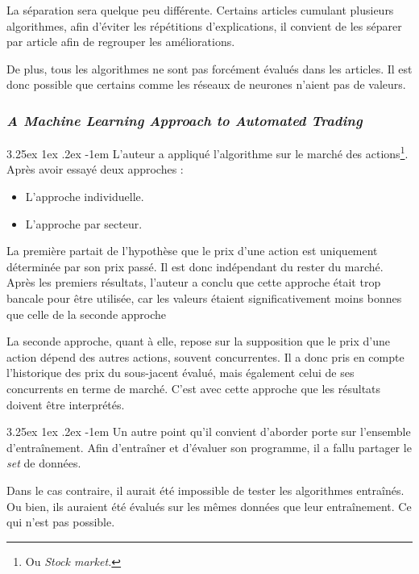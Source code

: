 \documentclass[a4paper, 11pt]{article}
\makeatletter
\newcounter{subsubsubsection}[subsubsection]
\renewcommand\paragraph{\@startsection{paragraph}{5}{\z@}%
  {3.25ex \@plus1ex \@minus.2ex}%
  {-1em}%
  {\normalfont\normalsize\bfseries}}
\makeatother
\begin{document}
La séparation sera quelque peu différente. Certains articles cumulant plusieurs algorithmes, afin d'éviter les répétitions d'explications, il convient de les séparer par article afin de regrouper les améliorations.

De plus, tous les algorithmes ne sont pas forcément évalués dans les articles. Il est donc possible que certains comme les réseaux de neurones n'aient pas de valeurs.

\subsubsection{\textit{A Machine Learning Approach to Automated Trading} \cite{machine_learning_automated_trading}}

\paragraph{}
L'auteur a appliqué l'algorithme sur le marché des actions\footnote{Ou \textit{Stock market.}}. Après avoir essayé deux approches :
\begin{itemize}
\item L'approche individuelle.
\item L'approche par secteur.
\end{itemize}

La première partait de l'hypothèse que le prix d'une action est uniquement déterminée par son prix passé. Il est donc indépendant du rester du marché. Après les premiers résultats, l'auteur a conclu que cette approche était trop bancale pour être utilisée, car les valeurs étaient significativement moins bonnes que celle de la seconde approche\cite{machine_learning_automated_trading}

La seconde approche, quant à elle, repose sur la supposition que le prix d'une action dépend des autres actions, souvent concurrentes. Il a donc pris en compte l'historique des prix du sous-jacent évalué, mais également celui de ses concurrents en terme de marché.
C'est avec cette approche que les résultats doivent être interprétés.

\paragraph{}
Un autre point qu'il convient d'aborder porte sur l'ensemble d'entraînement. Afin d'entraîner et d'évaluer son programme, il a fallu partager le \textit{set} de données.

Dans le cas contraire, il aurait été impossible de tester les algorithmes entraînés. Ou bien, ils auraient été évalués sur les mêmes données que leur entraînement. Ce qui n'est pas possible.
\end{document}
